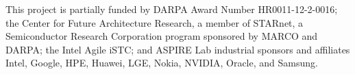 This project is partially funded by DARPA Award Number HR0011-12-2-0016; the
Center for Future Architecture Research, a member of STARnet, a Semiconductor
Research Corporation program sponsored by MARCO and DARPA; the Intel Agile
iSTC; and ASPIRE Lab industrial sponsors and affiliates Intel, Google, HPE,
Huawei, LGE, Nokia, NVIDIA, Oracle, and Samsung.
